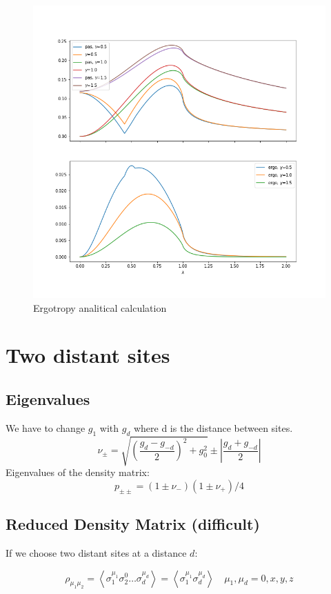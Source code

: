 \documentclass[12pt,a4paper]{book}
\theoremstyle{definition}
\begin{document}
\begin{figure}[h]
	\centering
	\includegraphics[width=0.7\linewidth]{graphs/Ergotheo_2sites}
	\caption{Ergotropy analitical calculation}
	\label{fig:ergotheo2sites}
\end{figure}

\clearpage
\section{Two distant sites}

\subsection{Eigenvalues}
We have to change $g_1$ with $g_d$ where d is the distance between sites. \cite{PhysRevA.78.052302}
\begin{equation}
	\nu_{\pm}=\sqrt{\left(\frac{g_{d}-g_{-d}}{2}\right)^{2}+g_{0}^{2}} \pm \left| \frac{g_{d}+g_{-d}}{2} \right|
\end{equation}
Eigenvalues of the density matrix:
\begin{equation}
	p_{\pm \pm } =(1 \pm \nu_-)(1 \pm \nu_+)/4
\end{equation}

\subsection{Reduced Density Matrix (difficult)}
If we choose two distant sites at a distance $d$:

\begin{equation}\label{eq:2distantsitespauli}
	\rho_{\mu_{1}  \mu_{2}}=\left\langle\sigma_{1}^{\mu_{1}}  \sigma_{2}^{0} \dots \sigma_{d}^{\mu_{d}}\right\rangle=\left\langle\sigma_{1}^{\mu_{1}}  \sigma_{d}^{\mu_{d}}\right\rangle \quad \mu_{1},\mu_{d}=0, x, y, z
\end{equation}
\end{document}
